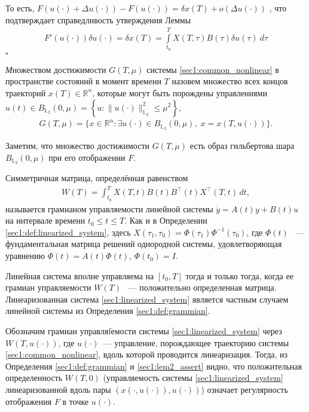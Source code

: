 \documentclass[../main.tex]{subfiles}
\begin{document}
То есть, $F(u(\cdot) + \Delta u(\cdot)) - F(u(\cdot)) = \delta x(T) + o(\Delta u(\cdot))$ , что подтверждает справедливость утверждения Леммы
\begin{gather}\label{sec1:lem2_assert}
    F'(u(\cdot))\delta u(\cdot) =\delta x(T) = \int\limits_{t_0}^{T} X(T, \tau) B(\tau) \delta u(\tau) \ d\tau
\end{gather}
\hfill $\square$
    
\begin{definition}
    {\textit  Множеством достижимости} $ G(T,\mu) $ системы \eqref{sec1:common_nonlinear} в пространстве состояний в момент времени $ T $ назовем множество всех концов траекторий $ x(T) \in \mathbb{R}^n $,  которые могут быть порождены управлениями $ u(t) \in B_{\mathbb{L}_2}(0,\mu) =\left\lbrace u:\lVert u(\cdot)\rVert^2_{\mathbb{L}_2} \leqslant \mu^2\right\rbrace  $,
    \begin{gather*}
        G(T,\mu)=\{x\in \mathbb{R}^n:\exists u(\cdot)\in B_{\mathbb{L}_2}(0,\mu),\; x=x(T,u(\cdot))\}.
    \end{gather*}
\end{definition}
    
Заметим, что множество достижимости $G(T,\mu)$ есть образ гильбертова шара $B_{\mathbb{L}_2}(0,\mu)$ при его отображении $F$.
    
\begin{definition}\label{sec1:def:grammian}
    Симметричная матрица, определённая равенством
    \begin{gather*}
        W(T) = \int_{t_0}^{T}X(T,t)B(t)B^{\top}(t)X^{\top}(T,t) \, dt,
    \end{gather*}
    называется грамианом управляемости линейной системы $\dot{y} = A(t) y + B(t) u $ на интервале времени $  t_0 \leqslant t \leqslant T $.
    Как и в Определении \ref{sec1:def:linearized_system}, здесь $ X(\tau_1,\tau_0)= \Phi(\tau_1) \Phi^{-1}(\tau_0) $, где $\Phi(t) $ ~--- фундаментальная матрица решений однородной системы, удовлетворяющая уравнению $ \dot{\Phi}(t) = A(t) \Phi(t)$, $ \Phi(t_0) = I $.
\end{definition}
    
Линейная система вполне управляема на  $ [t_0, T] $ тогда и только тогда, когда ее грамиан управляемости $W(T)$ ~--- положительно определенная матрица.
Линеаризованная система \eqref{sec1:linearized_system} является частным случаем линейной системы из Определения \ref{sec1:def:grammian}. 
    
Обозначим грамиан управляfемости системы \eqref{sec1:linearized_system} через $W(T,u(\cdot))$, где $u(\cdot)$~--- управление, порождающее траекторию системы \eqref{sec1:common_nonlinear}, вдоль которой проводится линеаризация.
Тогда, из Определения \ref{sec1:def:grammian} и \eqref{sec1:lem2_assert} видно, что положительная определенность $W(T,0)$ (управляемость системы \eqref{sec1:linearized_system} линеаризованной вдоль пары $\left( x(\cdot,u(\cdot)),u(\cdot)\right)   $) означает регулярность отображения $F$ в точке $u(\cdot) $. 
    
\end{document}

